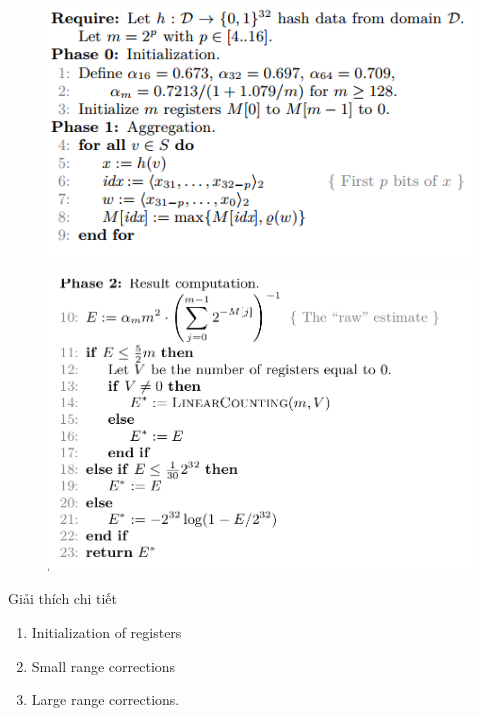 \documentclass{beamer}
\begin{document}
\begin{frame}
\begin{figure}[H]
\includegraphics[scale=0.3]{HLL1.png}

\end{figure}
\end{frame}
\begin{frame}
\begin{figure}[H]
\includegraphics[scale=0.3]{HLL2.png}
\end{figure}
\end{frame}

\begin{frame}{Giải thích chi tiết}
\begin{enumerate}
\item Initialization of registers
\item Small range corrections
\item Large range corrections.
\end{enumerate}
\end{frame}
\end{document}
